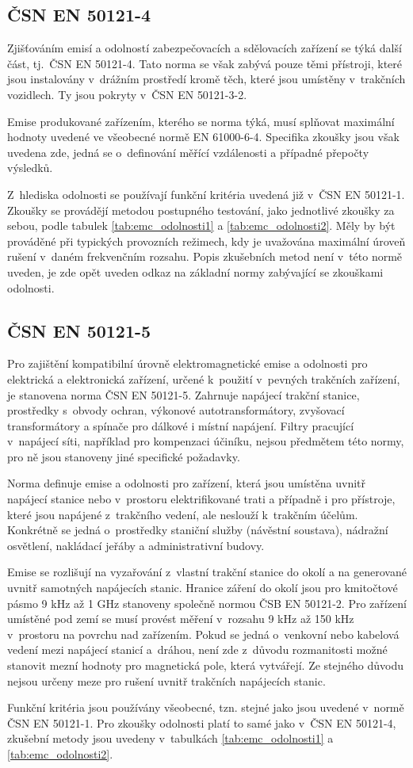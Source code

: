 \subsection{ČSN EN 50121-4}
Zjišťováním emisí a odolností zabezpečovacích a sdělovacích zařízení se týká další část, tj.~ČSN EN 50121-4. Tato norma se však zabývá pouze těmi přístroji, které jsou instalovány v~drážním prostředí kromě těch, které jsou umístěny v~trakčních vozidlech. Ty jsou pokryty v~ČSN EN 50121-3-2. 

Emise produkované zařízením, kterého se norma týká, musí splňovat maximální hodnoty uvedené ve všeobecné normě EN 61000-6-4. Specifika zkoušky jsou však uvedena zde, jedná se o~definování měřící vzdálenosti a případné přepočty výsledků.

Z~hlediska odolnosti se používají funkční kritéria uvedená již v~ČSN EN 50121-1. Zkoušky se provádějí metodou postupného testování, jako jednotlivé zkoušky za sebou, podle tabulek \ref{tab:emc_odolnosti1} a \ref{tab:emc_odolnosti2}.
 Měly by být prováděné při typických provozních režimech, kdy je uvažována maximální úroveň rušení v~daném frekvenčním rozsahu. Popis zkušebních metod není v~této normě uveden, je zde opět uveden odkaz na základní normy zabývající se zkouškami odolnosti. 

\subsection{ČSN EN 50121-5}
Pro zajištění kompatibilní úrovně elektromagnetické emise a odolnosti pro elektrická a elektronická zařízení, určené k~použití v~pevných trakčních zařízení, je stanovena norma ČSN EN 50121-5. Zahrnuje  napájecí trakční stanice, prostředky s~obvody ochran, výkonové autotransformátory, zvyšovací transformátory a spínače pro dálkové i místní napájení. Filtry pracující v~napájecí síti, například pro kompenzaci účiníku, nejsou předmětem této normy,  pro ně jsou stanoveny jiné specifické požadavky. 

Norma definuje emise a odolnosti pro zařízení, která jsou umístěna uvnitř napájecí stanice nebo v~prostoru elektrifikované trati a případně i pro přístroje, které jsou napájené z~trakčního vedení, ale neslouží k~trakčním účelům. Konkrétně se jedná o~prostředky staniční služby (návěstní soustava), nádražní osvětlení, nakládací jeřáby a administrativní budovy.  

Emise se rozlišují na vyzařování z~vlastní trakční stanice do okolí a na generované uvnitř samotných napájecích stanic. Hranice záření do okolí jsou pro kmitočtové pásmo 9 kHz až 1 GHz stanoveny společně normou ČSB EN 50121-2. Pro zařízení umístěné pod zemí se musí provést měření v~rozsahu 9 kHz až 150 kHz v~prostoru na povrchu nad zařízením. Pokud se jedná o~venkovní nebo kabelová vedení mezi napájecí stanicí a~dráhou, není zde z~důvodu rozmanitosti možné stanovit mezní hodnoty pro magnetická pole, která vytvářejí. Ze stejného důvodu nejsou určeny meze pro rušení uvnitř trakčních napájecích stanic. 

Funkční kritéria jsou používány všeobecné, tzn. stejné jako jsou uvedené v~normě ČSN EN 50121-1. Pro zkoušky odolnosti platí to samé jako v~ČSN EN 50121-4, zkušební metody jsou uvedeny v~tabulkách \ref{tab:emc_odolnosti1} a \ref{tab:emc_odolnosti2}.

